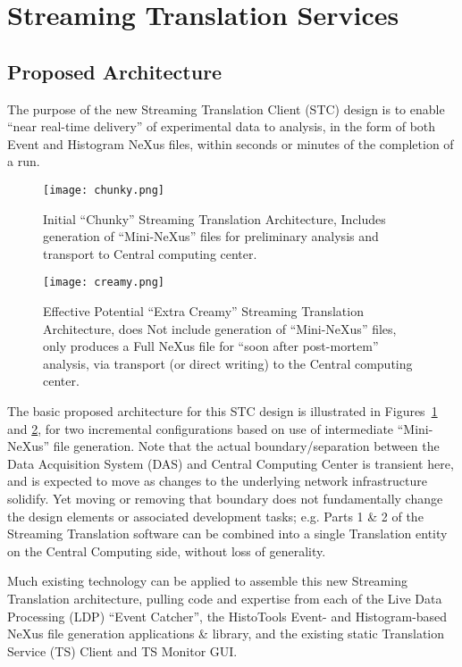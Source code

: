 \section{Streaming Translation Services}


\subsection{Proposed Architecture}

The purpose of the new Streaming Translation Client (STC) design is to enable
``near real-time delivery'' of experimental data to analysis, in the form of
both Event and Histogram NeXus files, within seconds or minutes of the
completion of a run.

\begin{figure}[htb]
\centering
\texttt{[image: chunky.png]}
\caption{Initial ``Chunky'' Streaming Translation Architecture, Includes
generation of ``Mini-NeXus'' files for preliminary analysis and transport to
Central computing center.}
\label{fig:chunky_stc}
\end{figure}


\begin{figure}[htb]
\centering
\texttt{[image: creamy.png]}
\caption{Effective Potential ``Extra Creamy'' Streaming Translation
Architecture, does Not include generation of ``Mini-NeXus'' files, only produces
a Full NeXus file for ``soon after post-mortem'' analysis, via transport (or
direct writing) to the Central computing center.}
\label{fig:creamy_stc}
\end{figure}


The basic proposed architecture for this STC design
is illustrated in Figures~\ref{fig:chunky_stc} and \ref{fig:creamy_stc},
for two incremental configurations based on use of intermediate
``Mini-NeXus'' file generation. Note that the actual boundary/separation between
the Data Acquisition System (DAS) and Central Computing Center is transient
here, and is expected to move as changes to the underlying network
infrastructure solidify. Yet moving or removing that boundary does not
fundamentally change the design elements or associated development tasks; e.g.
Parts 1 \& 2 of the Streaming Translation software can be combined into a
single Translation entity on the Central Computing side, without loss of
generality.


Much existing technology can be applied to assemble this new Streaming
Translation architecture, pulling code and expertise from each of the Live
Data Processing (LDP) ``Event Catcher'', the HistoTools Event- and
Histogram-based NeXus file generation applications \& library, and the
existing static Translation Service (TS) Client and TS Monitor GUI.  


